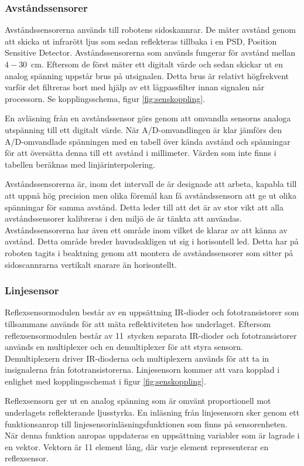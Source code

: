 \subsubsection{Avståndssensorer}
Avståndssensorerna används till robotens sidoskannrar. De mäter avstånd genom att skicka ut infrarött ljus som sedan reflekteras tillbaka i en PSD, Position Sensitive Detector. Avståndssensorerna som används fungerar för avstånd mellan \mbox{$4-30$ cm}. Eftersom de först mäter ett digitalt värde och sedan skickar ut en analog spänning uppstår brus på utsignalen. Detta brus är relativt högfrekvent varför det filtreras bort med hjälp av ett lågpassfilter innan signalen når processorn. Se kopplingsschema, figur \ref{fig:senskoppling}.

En avläsning från en avståndssensor görs genom att omvandla sensorns analoga utspänning till ett digitalt värde. När A/D-omvandlingen är klar jämförs den A/D-omvandlade spänningen med en tabell över kända avstånd och spänningar för att översätta denna till ett avstånd i millimeter. Värden som inte finns i tabellen beräknas med linjärinterpolering. 

Avståndssensorerna är, inom det intervall de är designade att arbeta, kapabla till att uppnå hög precision men olika föremål kan få avståndssensorn att ge ut olika spänningar för samma avstånd. Detta leder till att det är av stor vikt att alla avståndssensorer kalibreras i den miljö de är tänkta att användas. Avståndssensorerna har även ett område inom vilket de klarar av att känna av avstånd. Detta område breder huvudsakligen ut sig i horisontell led. Detta har på roboten tagits i beaktning genom att montera de avståndssensorer som sitter på sidoscannrarna vertikalt snarare än horisontellt.

\subsubsection{Linjesensor}
Reflexsensormodulen består av en uppsättning IR-dioder och fototransistorer som tillsammans används för att mäta reflektiviteten hos underlaget. Eftersom reflexsensormodulen består av 11~stycken separata IR-dioder och fototransistorer används en multiplexer och en demultiplexer för att styra sensorn. Demultiplexern driver IR-dioderna och multiplexern används för att ta in insignalerna från fototransistorerna. Linjesensorn kommer att vara kopplad i enlighet med kopplingsschemat i figur \ref{fig:senskoppling}.

Reflexsensorn ger ut en analog spänning som är omvänt proportionell mot underlagets reflekterande ljusstyrka. En inläsning från linjesensorn sker genom ett funktionsanrop till linjesensorinläsningsfunktionen som finns på sensorenheten. När denna funktion anropas uppdateras en uppsättning variabler som är lagrade i en vektor. Vektorn är 11 element lång, där varje element representerar en reflexsensor.

